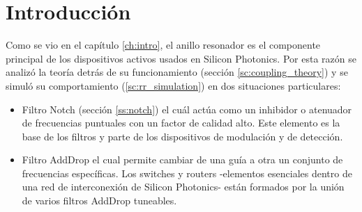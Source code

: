 \section{Introducción}
Como se vio en el capítulo \ref{ch:intro}, el anillo resonador es el componente principal 
de los dispositivos activos usados en Silicon Photonics. 
Por esta razón se analizó la teoría detrás de su funcionamiento 
(sección \ref{sc:coupling_theory}) y se simuló su comportamiento (\ref{sc:rr_simulation}) 
en dos situaciones particulares:

\begin{itemize}
\item Filtro Notch (sección \ref{ss:notch}) el cuál actúa como un inhibidor o atenuador de 
frecuencias puntuales con un factor de calidad alto. 
Este elemento es la base de los filtros y parte de los dispositivos de modulación y
de detección.

\item Filtro AddDrop el cual permite cambiar de una guía a otra un conjunto de 
frecuencias específicas. Los switches y routers 
-elementos esenciales dentro de una red de interconexión de Silicon Photonics- 
están formados por la unión de varios filtros AddDrop tuneables.

\end{itemize} 
